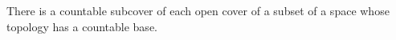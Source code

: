 There is a countable subcover of each open cover of a subset of a space whose topology has a countable base.
